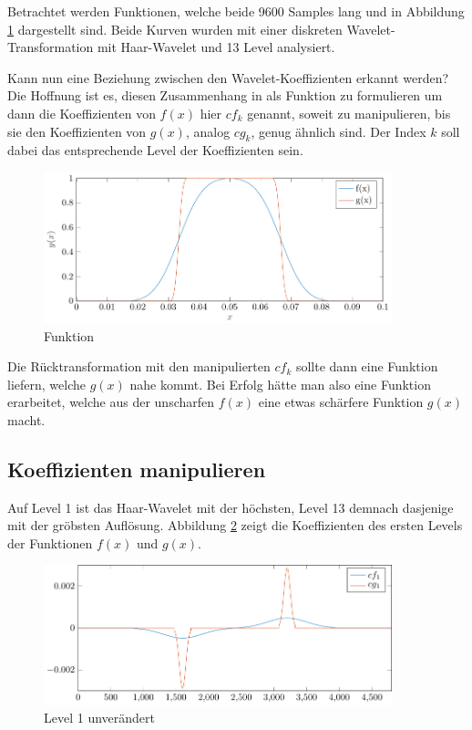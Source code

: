 Betrachtet werden Funktionen, welche beide 9600 Samples lang und in Abbildung \ref{deconvolve:1d} dargestellt sind.
Beide Kurven wurden mit einer diskreten Wavelet-Transformation mit Haar-Wavelet und 13 Level analysiert.


Kann nun eine Beziehung zwischen den Wavelet-Koeffizienten erkannt werden?
Die Hoffnung ist es, diesen Zusammenhang in als Funktion zu formulieren um dann die Koeffizienten von $f(x)$ hier $cf_k$ genannt, soweit zu manipulieren, bis sie den Koeffizienten von $g(x)$, analog $cg_k$, genug ähnlich sind.
Der Index $k$ soll dabei das entsprechende Level der Koeffizienten sein.
\begin{figure}[h]
\centering
\includegraphics[width=0.9\textwidth]{./papers/deconvolve/pictures/1d.pdf}
\caption{Funktion\label{deconvolve:1d}}
\end{figure}
Die Rücktransformation mit den manipulierten $cf_k$ sollte dann eine Funktion liefern, welche $g(x)$ nahe kommt.
Bei Erfolg hätte man also eine Funktion erarbeitet, welche aus der \glqq unscharfen\grqq{} $f(x)$ eine etwas \glqq schärfere\grqq{} Funktion $g(x)$ macht. 

\subsection{Koeffizienten manipulieren}
Auf Level 1 ist das Haar-Wavelet mit der höchsten, Level 13 demnach dasjenige mit der gröbsten Auflösung.
Abbildung \ref{deconvolve:level1} zeigt die Koeffizienten des ersten Levels der Funktionen $f(x)$ und $g(x)$.
\begin{figure}[h]
\centering
\includegraphics[width=0.9\textwidth]{./papers/deconvolve/pictures/level/level1.pdf}
\caption{Level 1 unverändert\label{deconvolve:level1}}
\end{figure}

